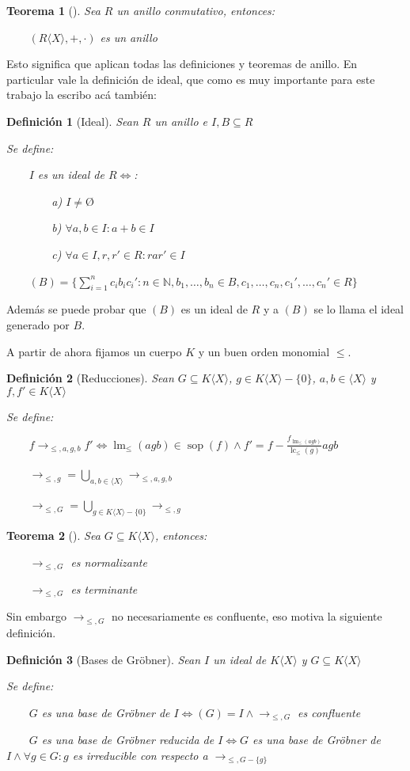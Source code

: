 \documentclass{amsbook}
\theoremstyle{customstyle}
\newtheorem{definition}{Definición}[section]
\newtheorem{theorem}{Teorema}[section]
\newcommand{\definición}[2][]{
  \begin{definition}[#1]
  \setlength{\parindent}{2em} %
  #2
  \end{definition}
}
\newcommand{\teorema}[2][]{
  \begin{theorem}[#1]
  \setlength{\parindent}{2em} %
  #2
  \end{theorem}
}
\DeclareMathOperator{\sop}{sop}
\DeclareMathOperator{\lm}{lm}
\DeclareMathOperator{\lc}{lc}
\begin{document}
\teorema[]{
Sea $R$ un anillo conmutativo, entonces:

    $(R⟨X⟩, +, ·)$ es un anillo

}

Esto significa que aplican todas las definiciones y teoremas de anillo.
En particular vale la definición de ideal, que como es muy importante para este trabajo la escribo acá también:

\definición[Ideal] {
Sean $R$ un anillo e $I, B ⊆ R$

Se define:

    $I$ es un ideal de $R ⇔$:

        a) $I ≠ Ø$

        b) $∀a, b ∈ I : a + b ∈ I$

        c) $∀a ∈ I, r, r' ∈ R : rar' ∈ I$

    $(B) = \{\sum_{i = 1}^n c_i b_i c_i' : n ∈ ℕ, b_1, …, b_n ∈ B, c_1, …, c_n, c_1', …, c_n' ∈ R\}$
}

Además se puede probar que $(B)$ es un ideal de $R$ y a $(B)$ se lo llama el ideal generado por $B$.

A partir de ahora fijamos un cuerpo $K$ y un buen orden monomial $≤$.

\definición[Reducciones] {
Sean $G ⊆ K⟨X⟩$, $g ∈ K⟨X⟩ - \{0\}$, $a, b ∈ ⟨X⟩$ y $f, f' ∈ K⟨X⟩$

Se define:

    $f →_{≤, a, g, b} f' ⇔ \lm_≤(agb) ∈ \sop(f) ∧ f' = f - \frac{f_{\lm_≤(agb)}}{\lc_≤(g)}agb$

    $→_{≤, g} = \bigcup_{a, b ∈ ⟨X⟩} →_{≤, a, g, b}$

    $→_{≤, G} = \bigcup_{g ∈ K⟨X⟩ - \{0\}} →_{≤, g}$
}

\teorema[]{
Sea $G ⊆ K⟨X⟩$, entonces:

    $→_{≤, G}$ es normalizante

    $→_{≤, G}$ es terminante

}

Sin embargo $→_{≤, G}$ no necesariamente es confluente, eso motiva la siguiente definición.

\definición[Bases de Gröbner] {
Sean $I$ un ideal de $K⟨X⟩$ y $G ⊆ K⟨X⟩$

Se define:

    $G$ es una base de Gröbner de $I ⇔ (G) = I ∧ →_{≤, G}$ es confluente

    $G$ es una base de Gröbner reducida de $I ⇔ G$ es una base de Gröbner de $I ∧ ∀g ∈ G : g$ es irreducible con respecto a $→_{≤, G - \{g\}}$

}
\end{document}
